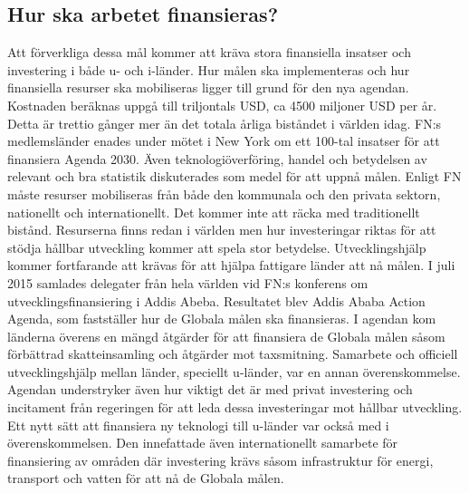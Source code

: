\documentclass{report}
\begin{document}
\subsection{Hur ska arbetet finansieras?} 
Att förverkliga dessa mål kommer att kräva stora finansiella insatser och  investering i både u- och i-länder. \cite{web2030agenda}
Hur målen ska implementeras och hur finansiella resurser ska mobiliseras ligger till grund för den nya agendan. \cite{webUNASweden}
Kostnaden beräknas uppgå till triljontals USD, \cite{web2030agenda} ca 4500 miljoner USD per år. Detta är trettio gånger mer än det totala årliga biståndet i världen idag. \cite{webUNICEF} FN:s medlemsländer enades under mötet i New York om ett 100-tal insatser för att finansiera Agenda 2030. Även teknologiöverföring, handel och betydelsen av relevant och bra statistik diskuterades som medel för att uppnå målen. \cite{webUNASweden}
Enligt FN måste resurser mobiliseras från både den kommunala och den privata sektorn, nationellt och internationellt. Det kommer inte att räcka med traditionellt bistånd. Resurserna finns redan i världen men hur investeringar riktas för att stödja hållbar utveckling kommer att spela stor betydelse. Utvecklingshjälp kommer fortfarande att krävas för att hjälpa fattigare länder att nå målen. 
\cite{web2030agenda}
I juli 2015 samlades delegater från hela världen vid FN:s konferens om utvecklingsfinansiering i Addis Abeba. Resultatet blev Addis Ababa Action Agenda, som fastställer hur de Globala målen ska finansieras.\cite{webSIDA}
I agendan kom länderna överens en mängd åtgärder för att finansiera de Globala målen såsom förbättrad skatteinsamling och åtgärder mot taxsmitning. Samarbete och officiell utvecklingshjälp mellan länder, speciellt u-länder, var en annan överenskommelse. Agendan understryker även hur viktigt det är med privat investering och incitament från regeringen för att leda dessa investeringar mot hållbar utveckling. Ett nytt sätt att finansiera ny teknologi till u-länder var också med i överenskommelsen. Den innefattade även internationellt samarbete för finansiering av områden där investering krävs såsom infrastruktur för energi, transport och vatten för att nå de Globala målen.  
\cite{webUNDESA}\\
\end{document}
